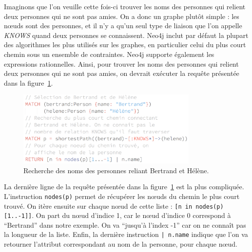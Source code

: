 		Imaginons que l'on veuille cette fois-ci trouver les noms des personnes qui relient deux personnes qui ne sont pas amies. On a donc un graphe plutôt simple : les nœuds sont des personnes, et il n'y a qu'un seul type de liaison que l'on appelle \textit{KNOWS} quand deux personnes se connaissent. Neo4j inclut par défaut la plupart des algorithmes les plus utilisés sur les graphes, en particulier celui du plus court chemin sous un ensemble de contraintes. Neo4j supporte également les expressions rationnelles. Ainsi, pour trouver les noms des personnes qui relient deux personnes qui ne sont pas amies, on devrait exécuter la requête présentée dans la figure~\ref{connectingFriends}.

		\begin{figure}[H]
			\centering
			\includegraphics[width=0.8\textwidth]{images/connectingFriends.png}
			\caption{Recherche des noms des personnes reliant Bertrand et Hélène.}
			\label{connectingFriends}
		\end{figure}

		La dernière ligne de la requête présentée dans la figure~\ref{connectingFriends} est la plus compliquée. L'instruction \texttt{nodes(p)} permet de récupérer les nœuds du chemin le plus court trouvé. On itère ensuite sur chaque nœud de cette liste : \texttt{[n in nodes(p)[1..-1]]}. On part du nœud d'indice 1, car le nœud d'indice 0 correspond à \enquote{Bertrand} dans notre exemple. On va \enquote{jusqu'à l'index -1} car on ne connaît pas la longueur de la liste. Enfin, la dernière instruction \texttt{| n.name} indique que l'on va retourner l'attribut correspondant au nom de la personne, pour chaque nœud.

